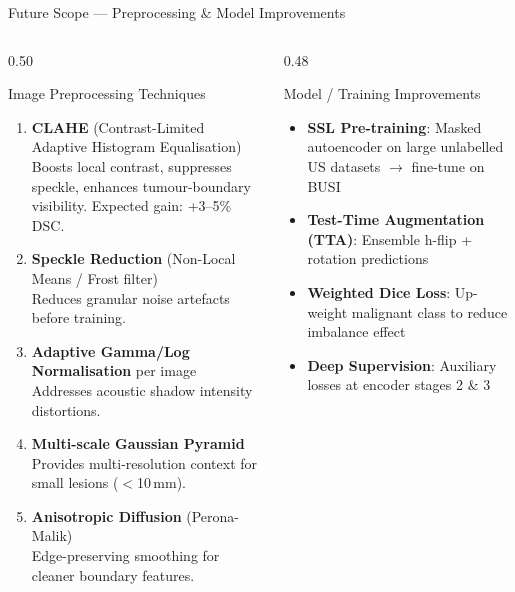 \documentclass[aspectratio=169,10pt]{beamer}
\begin{document}
\begin{frame}{Future Scope --- Preprocessing \& Model Improvements}
  \begin{columns}[T]
    \begin{column}{0.50\textwidth}
      \begin{block}{Image Preprocessing Techniques}
        \begin{enumerate}
          \item \textbf{CLAHE} (Contrast-Limited Adaptive Histogram Equalisation)\\
            {\footnotesize Boosts local contrast, suppresses speckle, enhances
            tumour-boundary visibility. Expected gain: +3--5\% DSC.}
          \item \textbf{Speckle Reduction} (Non-Local Means / Frost filter)\\
            {\footnotesize Reduces granular noise artefacts before training.}
          \item \textbf{Adaptive Gamma/Log Normalisation} per image\\
            {\footnotesize Addresses acoustic shadow intensity distortions.}
          \item \textbf{Multi-scale Gaussian Pyramid}\\
            {\footnotesize Provides multi-resolution context for small lesions ($<$10\,mm).}
          \item \textbf{Anisotropic Diffusion} (Perona-Malik)\\
            {\footnotesize Edge-preserving smoothing for cleaner boundary features.}
        \end{enumerate}
      \end{block}
    \end{column}
    \begin{column}{0.48\textwidth}
      \begin{block}{Model / Training Improvements}
        \begin{itemize}
          \item \textbf{SSL Pre-training}: Masked autoencoder on large unlabelled US datasets $\to$ fine-tune on BUSI
          \item \textbf{Test-Time Augmentation (TTA)}: Ensemble h-flip + rotation predictions
          \item \textbf{Weighted Dice Loss}: Up-weight malignant class to reduce imbalance effect
          \item \textbf{Deep Supervision}: Auxiliary losses at encoder stages 2 \& 3

\end{itemize}
\end{block}
\end{column}
\end{columns}
\end{frame}
\end{document}
